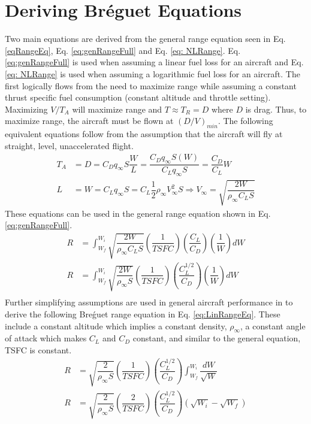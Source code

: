 \section{Deriving Br\'eguet Equations}
\label{section: derive equations}
Two main equations are derived from the general range equation seen in Eq. \ref{eqRangeEq}, Eq. \ref{eq:genRangeFull} and Eq. \ref{eq: NLRange}. Eq. \ref{eq:genRangeFull} is used when assuming a linear fuel loss for an aircraft and Eq. \ref{eq: NLRange} is used when assuming a logarithmic fuel loss for an aircraft. The first logically flows from the need to maximize range while assuming a constant thrust specific fuel consumption (constant altitude and throttle setting). Maximizing $V/T_A$ will maximize range and $T \approx T_R = D$ where $D$ is drag. Thus, to maximize range, the aircraft must be flown at $(D/V)_{min}$. The following equivalent equations follow from the assumption that the aircraft will fly at straight, level, unaccelerated flight.
\begin{align}
    T_A&=D = C_Dq_{\infty}S \dfrac{W}{L} = \dfrac{C_Dq_{\infty}S(W)}{C_Lq_{\infty}S} = \dfrac{C_D}{C_L}W\\
    L &= W = C_Lq_{\infty}S = C_L\dfrac{1}{2}\rho_{\infty}V^2_{\infty}S \Rightarrow V_{\infty} = \sqrt{\dfrac{2W}{\rho_{\infty}C_LS}}
    \label{eq: VequivalentEq}
\end{align}
These equations can be used in the general range equation shown in Eq. \ref{eq:genRangeFull}.
\begin{equation}
\label{eq:genRangeFull}
    \begin{aligned}
        R &= \int_{W_f}^{W_i}\sqrt{\dfrac{2W}{\rho_{\infty}C_LS}}\left(\dfrac{1}{TSFC}\right)\left(\dfrac{C_L}{C_D}\right)\left(\dfrac{1}{W}\right)dW\\
        R &= \int_{W_f}^{W_i}\sqrt{\dfrac{2W}{\rho_{\infty}S}}\left(\dfrac{1}{TSFC}\right)\left(\dfrac{C_L^{1/2}}{C_D}\right)\left(\dfrac{1}{W}\right)dW\\
    \end{aligned}
\end{equation}
Further simplifying assumptions are used in general aircraft performance in \cite{IntroACMechanics} to derive the following Bre\'guet range equation in Eq. \ref{eq:LinRangeEq}. These include a constant altitude which implies a constant density, $\rho_{\infty}$, a constant angle of attack which makes $C_L$ and $C_D$ constant, and similar to the general equation, TSFC is constant.
\begin{equation}
\label{eq:LinRangeEq}
    \begin{aligned}
        R &= \sqrt{\dfrac{2}{\rho_{\infty}S}}\left(\dfrac{1}{TSFC}\right)\left(\dfrac{C_L^{1/2}}{C_D}\right)\int_{W_f}^{W_i}\dfrac{dW}{\sqrt{W}}\\
        R &= \sqrt{\dfrac{2}{\rho_{\infty}S}}\left(\dfrac{2}{TSFC}\right)\left(\dfrac{C_L^{1/2}}{C_D}\right)(\sqrt{W_i}-\sqrt{W_f})
    \end{aligned}
\end{equation} \par
